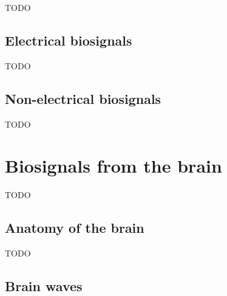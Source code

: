 TODO


\subsection{Electrical biosignals}
\label{subsec:biomedical_signals_origin_electrical}



TODO


\subsection{Non-electrical biosignals}
\label{subsec:biomedical_signals_origin_non_electrical}



TODO



\section{Biosignals from the brain}
\label{sec:biomedical_signals_brain_signals}


TODO



\subsection{Anatomy of the brain}
\label{subsec:biomedical_signals_brain_signals_anatomy}


TODO


\subsection{Brain waves}
\label{subsec:biomedical_signals_brain_signals_brain_waves}

